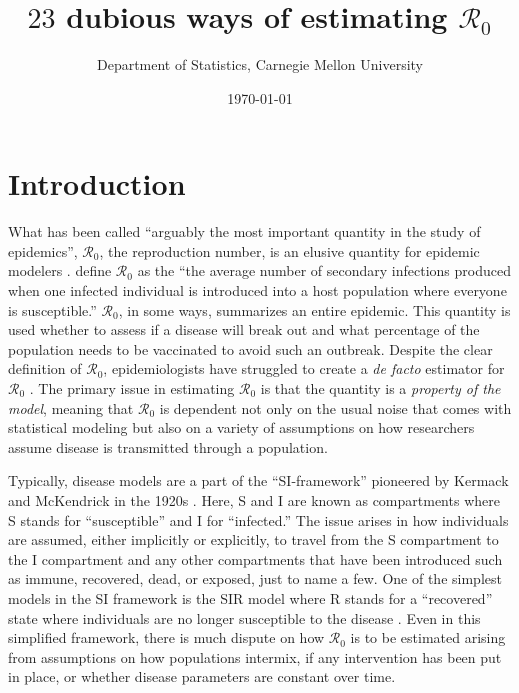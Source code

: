 \documentclass[12pt]{article}
\newcommand{\XX}{\ensuremath{23}} %
\newcommand{\rr}{\ensuremath{\mathcal{R}_0}}
\begin{document}
\title{$\XX$ dubious ways of estimating $\rr$}
\author{ Department of Statistics, Carnegie Mellon University}
\date{\today}
\maketitle


\section{Introduction}\label{sec:intro}
What has been called ``arguably the most important quantity in the study of epidemics'', $\mathcal{R}_0$, the reproduction number, is an elusive quantity for epidemic modelers \cite{Heesterbeek2002}.  \citet{anderson1992} define $\rr$ as the ``the average number of secondary infections produced when one infected individual is introduced into a host population where everyone is susceptible.''  $\rr$, in some ways, summarizes an entire epidemic.  This quantity is used whether to assess if a disease will break out and what percentage of the population needs to be vaccinated to avoid such an outbreak.  Despite the clear definition of $\rr$, epidemiologists have struggled to create a \textit{de facto} estimator for $\rr$  \citep{hethcote2000}.  The primary issue in estimating $\rr$ is that the quantity is a \textit{property of the model}, meaning that $\rr$ is dependent not only on the usual noise that comes with statistical modeling but also on a variety of assumptions on how researchers assume disease is transmitted through a population.

Typically, disease models are a part of the ``SI-framework'' pioneered by Kermack and McKendrick in the 1920s \citep{getz2006}.  Here, S and I are known as compartments where S stands for ``susceptible'' and I for ``infected.''  The issue arises in how individuals are assumed, either implicitly or explicitly, to travel from the S compartment to the I compartment and any other compartments that have been introduced such as immune, recovered, dead, or exposed, just to name a few.  One of the simplest models in the SI framework is the SIR model where R stands for a ``recovered'' state where individuals are no longer susceptible to the disease \citep{Kermack700}.  Even in this simplified framework, there is much dispute on how $\rr$ is to be estimated arising from assumptions on how populations intermix, if any intervention has been put in place, or whether disease parameters are constant over time.
\end{document}
